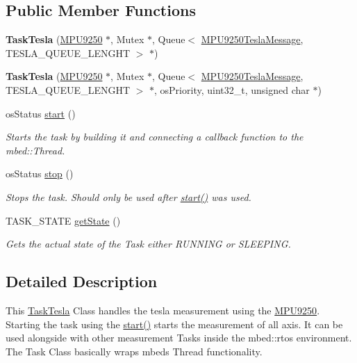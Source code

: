 \subsection*{Public Member Functions}
\begin{DoxyCompactItemize}
\item 
\hypertarget{class_task_tesla_a101ec7162d49ea514b7edd10a34dca9f}{}{\bfseries Task\+Tesla} (\hyperlink{class_m_p_u9250}{M\+P\+U9250} $\ast$, Mutex $\ast$, Queue$<$ \hyperlink{class_m_p_u9250_tesla_message}{M\+P\+U9250\+Tesla\+Message}, T\+E\+S\+L\+A\+\_\+\+Q\+U\+E\+U\+E\+\_\+\+L\+E\+N\+G\+H\+T $>$ $\ast$)\label{class_task_tesla_a101ec7162d49ea514b7edd10a34dca9f}

\item 
\hypertarget{class_task_tesla_a33d2cc04f1b73014de76ce9fdcbecf09}{}{\bfseries Task\+Tesla} (\hyperlink{class_m_p_u9250}{M\+P\+U9250} $\ast$, Mutex $\ast$, Queue$<$ \hyperlink{class_m_p_u9250_tesla_message}{M\+P\+U9250\+Tesla\+Message}, T\+E\+S\+L\+A\+\_\+\+Q\+U\+E\+U\+E\+\_\+\+L\+E\+N\+G\+H\+T $>$ $\ast$, os\+Priority, uint32\+\_\+t, unsigned char $\ast$)\label{class_task_tesla_a33d2cc04f1b73014de76ce9fdcbecf09}

\item 
os\+Status \hyperlink{class_task_tesla_a42c4e57484a682500f4c0c3079df494e}{start} ()
\begin{DoxyCompactList}\small\item\em Starts the task by building it and connecting a callback function to the mbed\+::\+Thread. \end{DoxyCompactList}\item 
os\+Status \hyperlink{class_task_tesla_a452f3189815c358c87007e31c1aad5aa}{stop} ()
\begin{DoxyCompactList}\small\item\em Stops the task. Should only be used after \hyperlink{class_task_tesla_a42c4e57484a682500f4c0c3079df494e}{start()} was used. \end{DoxyCompactList}\item 
T\+A\+S\+K\+\_\+\+S\+T\+A\+T\+E \hyperlink{class_task_tesla_a324faa820e865a3c76b0decd359bd431}{get\+State} ()
\begin{DoxyCompactList}\small\item\em Gets the actual state of the Task either R\+U\+N\+N\+I\+N\+G or S\+L\+E\+E\+P\+I\+N\+G. \end{DoxyCompactList}\end{DoxyCompactItemize}


\subsection{Detailed Description}
This \hyperlink{class_task_tesla}{Task\+Tesla} Class handles the tesla measurement using the \hyperlink{class_m_p_u9250}{M\+P\+U9250}. Starting the task using the \hyperlink{class_task_tesla_a42c4e57484a682500f4c0c3079df494e}{start()} starts the measurement of all axis. It can be used alongside with other measurement Tasks inside the mbed\+::rtos environment. The Task Class basically wraps mbeds Thread functionality. 

